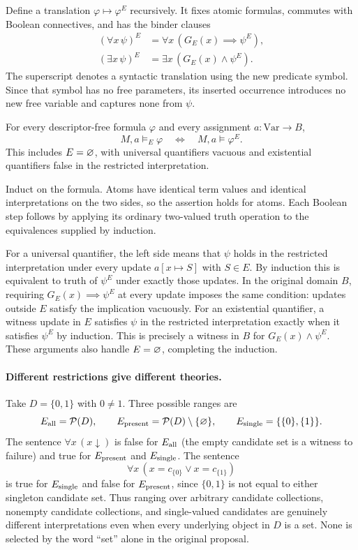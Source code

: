 Define a translation $\varphi\mapsto\varphi^E$ recursively. It fixes
atomic formulas, commutes with Boolean connectives, and has the binder
clauses
\[
\begin{split}
(\forall x\,\psi)^E&=\forall x\,(G_E(x)\implies\psi^E),\\
(\exists x\,\psi)^E&=\exists x\,(G_E(x)\land\psi^E).
\end{split}
\]
The superscript denotes a syntactic translation using the new predicate
symbol. Since that symbol has no free parameters, its inserted occurrence
introduces no new free variable and captures none from $\psi$.

\begin{proposition}
\label{prop:candidate_quantifier_relativization}
For every descriptor-free formula $\varphi$ and every assignment
$a:\mathrm{Var}\to B$,
\[
M,a\vDash_E\varphi\quad\Longleftrightarrow\quad
M,a\vDash\varphi^E.
\]
This includes $E=\varnothing$, with universal quantifiers vacuous and
existential quantifiers false in the restricted interpretation.
\end{proposition}
\Proof
Induct on the formula. Atoms have identical term values and identical
interpretations on the two sides, so the assertion holds for atoms.
Each Boolean step follows by applying its ordinary two-valued truth
operation to the equivalences supplied by induction.

For a universal quantifier, the left side means that $\psi$ holds in
the restricted interpretation under every update $a[x\mapsto S]$
with $S\in E$. By induction this is equivalent to truth of $\psi^E$
under exactly those updates. In the original domain $B$, requiring
$G_E(x)\implies\psi^E$ at every update imposes the same condition:
updates outside $E$ satisfy the implication vacuously. For an existential
quantifier, a witness update in $E$ satisfies $\psi$ in the restricted
interpretation exactly when it satisfies $\psi^E$ by induction. This
is precisely a witness in $B$ for $G_E(x)\land\psi^E$.
These arguments also handle $E=\varnothing$, completing the induction.
\Done

\paragraph{Different restrictions give different theories.}
Take $D=\{0,1\}$ with $0\ne1$. Three possible ranges are
\[
E_{\rm all}=\mathcal P(D),\qquad
E_{\rm present}=\mathcal P(D)\setminus\{\varnothing\},\qquad
E_{\rm single}=\{\{0\},\{1\}\}.
\]
The sentence $\forall x\,(x\downarrow)$ is false for $E_{\rm all}$
(the empty candidate set is a witness to failure) and true for
$E_{\rm present}$ and $E_{\rm single}$. The sentence
\[
\forall x\,(x=c_{\{0\}}\lor x=c_{\{1\}})
\]
is true for $E_{\rm single}$ and false for $E_{\rm present}$,
since $\{0,1\}$ is not equal to either singleton candidate set.
Thus ranging over arbitrary candidate collections, nonempty candidate
collections, and single-valued candidates are genuinely different
interpretations even when every underlying object in $D$ is a set.
None is selected by the word ``set'' alone in the original proposal.

